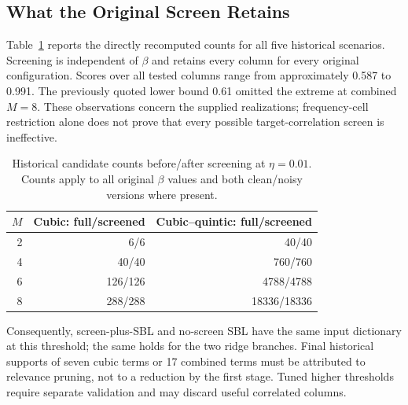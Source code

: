 \documentclass[conference]{IEEEtran}
\begin{document}
\subsection{What the Original Screen Retains}
Table~\ref{tab:screen-counts} reports the directly recomputed counts for all five historical scenarios. Screening is independent of $\beta$ and retains every column for every original configuration. Scores over all tested columns range from approximately 0.587 to 0.991. The previously quoted lower bound 0.61 omitted the extreme at combined $M=8$. These observations concern the supplied realizations; frequency-cell restriction alone does not prove that every possible target-correlation screen is ineffective.
\begin{table}[!t]
\caption{Historical candidate counts before/after screening at $\eta=0.01$. Counts apply to all original $\beta$ values and both clean/noisy versions where present.}\label{tab:screen-counts}
\centering\small
\begin{tabular}{rrr}\toprule
$M$ & Cubic: full/screened & Cubic--quintic: full/screened\\\midrule
2 & 6/6 & 40/40\\4 & 40/40 & 760/760\\
6 & 126/126 & 4788/4788\\8 & 288/288 & 18336/18336\\\bottomrule
\end{tabular}
\end{table}
Consequently, screen-plus-SBL and no-screen SBL have the same input dictionary at this threshold; the same holds for the two ridge branches. Final historical supports of seven cubic terms or 17 combined terms must be attributed to relevance pruning, not to a reduction by the first stage. Tuned higher thresholds require separate validation and may discard useful correlated columns.
\end{document}
